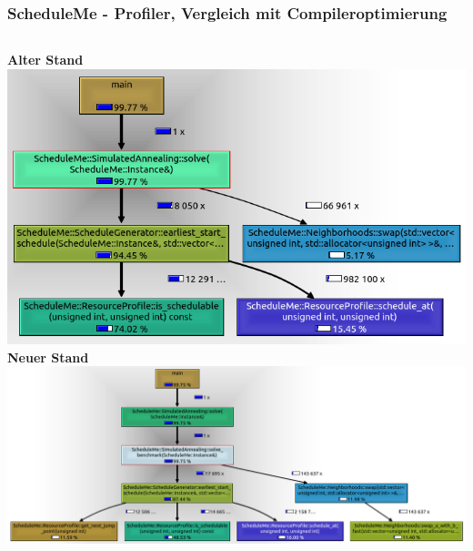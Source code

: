 \documentclass[aspectratio=169]{beamer}
\begin{document}

\begin{frame}
\frametitle{ScheduleMe - Profiler, Vergleich mit Compileroptimierung}

	\begin{columns}[c]
			\centering
			\vspace{10pt}
			\textbf{Alter Stand}
			\includegraphics[width=\textwidth]{../images/profiler_old_O3.png}
			\centering
			\vspace{10pt}
			\textbf{Neuer Stand}
		\includegraphics[width=\textwidth]{../images/profiler_new_O3.png}
	\end{columns}

\end{frame}

\end{document}
